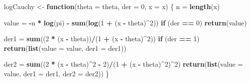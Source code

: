 \documentclass[12pt,]{article}
\newenvironment{Shaded}{\begin{snugshade}}{\end{snugshade}}
\newcommand{\ControlFlowTok}[1]{\textcolor[rgb]{0.13,0.29,0.53}{\textbf{#1}}}
\newcommand{\DataTypeTok}[1]{\textcolor[rgb]{0.13,0.29,0.53}{#1}}
\newcommand{\DecValTok}[1]{\textcolor[rgb]{0.00,0.00,0.81}{#1}}
\newcommand{\KeywordTok}[1]{\textcolor[rgb]{0.13,0.29,0.53}{\textbf{#1}}}
\newcommand{\NormalTok}[1]{#1}
\newcommand{\OperatorTok}[1]{\textcolor[rgb]{0.81,0.36,0.00}{\textbf{#1}}}
\newcommand{\StringTok}[1]{\textcolor[rgb]{0.31,0.60,0.02}{#1}}
\begin{document}
\begin{Shaded}
\begin{Highlighting}[]
\NormalTok{logCauchy <-}\StringTok{ }\ControlFlowTok{function}\NormalTok{(}\DataTypeTok{theta =}\NormalTok{ theta, }\DataTypeTok{der =} \DecValTok{0}\NormalTok{, }\DataTypeTok{x =}\NormalTok{ x) \{}
\NormalTok{    n =}\StringTok{ }\KeywordTok{length}\NormalTok{(x)}
    
\NormalTok{    value =}\StringTok{ }\OperatorTok{-}\NormalTok{n }\OperatorTok{*}\StringTok{ }\KeywordTok{log}\NormalTok{(pi) }\OperatorTok{-}\StringTok{ }\KeywordTok{sum}\NormalTok{(}\KeywordTok{log}\NormalTok{(}\DecValTok{1} \OperatorTok{+}\StringTok{ }\NormalTok{(x }\OperatorTok{-}\StringTok{ }\NormalTok{theta)}\OperatorTok{^}\DecValTok{2}\NormalTok{))}
    \ControlFlowTok{if}\NormalTok{ (der }\OperatorTok{==}\StringTok{ }\DecValTok{0}\NormalTok{) }
        \KeywordTok{return}\NormalTok{(value)}
    
\NormalTok{    der1 =}\StringTok{ }\KeywordTok{sum}\NormalTok{((}\DecValTok{2} \OperatorTok{*}\StringTok{ }\NormalTok{(x }\OperatorTok{-}\StringTok{ }\NormalTok{theta))}\OperatorTok{/}\NormalTok{(}\DecValTok{1} \OperatorTok{+}\StringTok{ }\NormalTok{(x }\OperatorTok{-}\StringTok{ }\NormalTok{theta)}\OperatorTok{^}\DecValTok{2}\NormalTok{))}
    \ControlFlowTok{if}\NormalTok{ (der }\OperatorTok{==}\StringTok{ }\DecValTok{1}\NormalTok{) }
        \KeywordTok{return}\NormalTok{(}\KeywordTok{list}\NormalTok{(}\DataTypeTok{value =}\NormalTok{ value, }\DataTypeTok{der1 =}\NormalTok{ der1))}
    
\NormalTok{    der2 =}\StringTok{ }\KeywordTok{sum}\NormalTok{((}\DecValTok{2} \OperatorTok{*}\StringTok{ }\NormalTok{(x }\OperatorTok{-}\StringTok{ }\NormalTok{theta)}\OperatorTok{^}\DecValTok{2} \OperatorTok{-}\StringTok{ }\DecValTok{2}\NormalTok{)}\OperatorTok{/}\NormalTok{(}\DecValTok{1} \OperatorTok{+}\StringTok{ }\NormalTok{(x }\OperatorTok{-}\StringTok{ }\NormalTok{theta)}\OperatorTok{^}\DecValTok{2}\NormalTok{)}\OperatorTok{^}\DecValTok{2}\NormalTok{)}
    \KeywordTok{return}\NormalTok{(}\KeywordTok{list}\NormalTok{(}\DataTypeTok{value =}\NormalTok{ value, }\DataTypeTok{der1 =}\NormalTok{ der1, }\DataTypeTok{der2 =}\NormalTok{ der2))}
\NormalTok{\}}


\end{Highlighting}
\end{Shaded}
\end{document}
